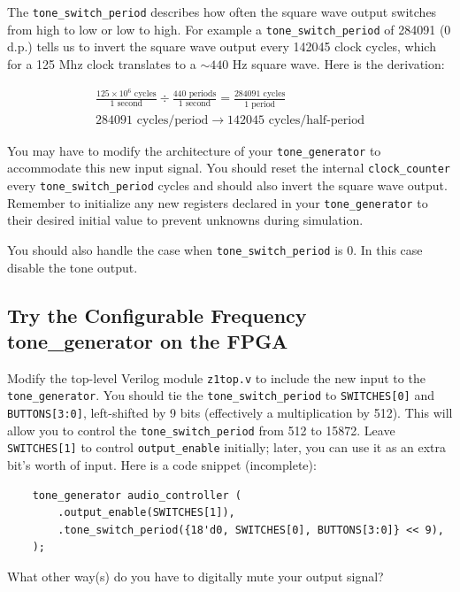 \documentclass[11pt]{article}
\begin{document}
The \verb|tone_switch_period| describes how often the square wave output switches from high to low or low to high. For example a \verb|tone_switch_period| of 284091 (0 d.p.) tells us to invert the square wave output every 142045 clock cycles, which for a 125 Mhz clock translates to a $\sim 440$ Hz square wave. Here is the derivation:

\begin{eqnarray}
  \frac{125 \times 10^6 \text{ cycles}}{1 \text{ second}} \div \frac{440 \text{ periods}}{1 \text{ second}} = \frac{ 284091 \text{ cycles}}{1 \text{ period}} \nonumber \\
  284091 \text{ cycles/period} \rightarrow 142045 \text{ cycles/half-period} \nonumber
\end{eqnarray}

You may have to modify the architecture of your \verb|tone_generator| to accommodate this new input signal. You should reset the internal \verb|clock_counter| every \verb|tone_switch_period| cycles and should also invert the square wave output. Remember to initialize any new registers declared in your \verb|tone_generator| to their desired initial value to prevent unknowns during simulation.

You should also handle the case when \verb|tone_switch_period| is 0.  In this case disable the tone output.

\subsection{Try the Configurable Frequency tone\_generator on the FPGA}
Modify the top-level Verilog module \verb|z1top.v| to include the new input to the \verb|tone_generator|. You should tie the \verb|tone_switch_period| to \verb|SWITCHES[0]| and \verb|BUTTONS[3:0]|, left-shifted by 9 bits (effectively a multiplication by 512). This will allow you to control the \verb|tone_switch_period| from 512 to 15872. Leave \verb|SWITCHES[1]| to control \verb|output_enable| initially; later, you can use it as an extra bit's worth of input. Here is a code snippet (incomplete):

\begin{verbatim}
    tone_generator audio_controller (
        .output_enable(SWITCHES[1]),
        .tone_switch_period({18'd0, SWITCHES[0], BUTTONS[3:0]} << 9),
    );
\end{verbatim}

What other way(s) do you have to digitally mute your output signal?
\end{document}
